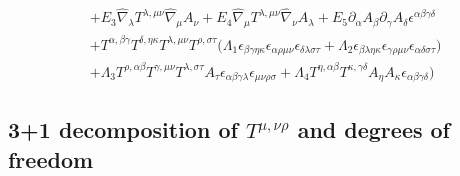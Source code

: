 \documentclass[%
  showpacs,showkeys,prd,superscriptaddress]{revtex4-1}
\begin{document}
\begin{equation}
\begin{split}
    & +E_3\hat\nabla_\lambda T^{\lambda,\mu\nu}\hat\nabla_\mu A_\nu+E_4\hat\nabla_\mu T^{\lambda,\mu\nu}\hat\nabla_\nu A_\lambda + E_5\partial_\alpha A_\beta\partial_\gamma A_\delta \epsilon^{\alpha\beta\gamma\delta}
    \\
    & +T^{\alpha,\beta\gamma}T^{\delta,\eta\kappa}T^{\lambda,\mu\nu}T^{\rho,\sigma\tau}\Big(\Lambda_1\epsilon_{\beta\gamma\eta\kappa}\epsilon_{\alpha\rho\mu\nu}\epsilon_{\delta\lambda\sigma\tau}+\Lambda_2\epsilon_{\beta\lambda\eta\kappa}\epsilon_{\gamma\rho\mu\nu}\epsilon_{\alpha\delta\sigma\tau}\Big)
    \\
    & +\Lambda_3 T^{\rho,\alpha\beta}T^{\gamma,\mu\nu}T^{\lambda,\sigma\tau}A_\tau \epsilon_{\alpha\beta\gamma\lambda}\epsilon_{\mu\nu\rho\sigma}+\Lambda_4T^{\eta,\alpha\beta}T^{\kappa,\gamma\delta}A_\eta A_\kappa\epsilon_{\alpha\beta\gamma\delta}\Bigg)
  \end{split}
\end{equation}


\subsection*{3+1 decomposition of $T^{\mu,\nu\rho}$ and degrees of freedom}
\end{document}
